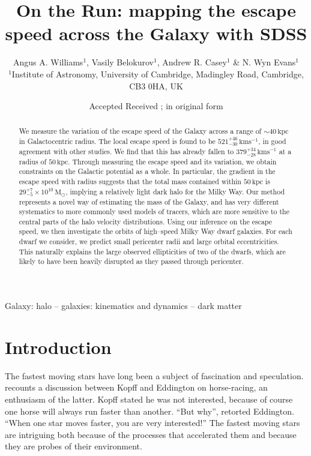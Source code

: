\documentclass[useAMS,twocolumn,usenatbib]{mn2e}
\title[Fast moving stars in SDSS] {On the Run: mapping the escape speed across the Galaxy with SDSS}
\author[Williams, Belokurov, Casey \& Evans]{Angus A. Williams$^1$,
  Vasily Belokurov$^1$, Andrew R. Casey$^1$ \& N. Wyn Evans$^1$
  \medskip
  \\$^1$Institute of Astronomy, University of Cambridge, Madingley Road, Cambridge, CB3 0HA, UK}
\def\kpc{{\,\mathrm{kpc}}}
\def\kms{{\,\mathrm{kms^{-1}}}}
\def\Msun{{\,\mathrm{M}_\odot}}
\begin{document}
\date{Accepted  Received ; in original form }

\pagerange{\pageref{firstpage}--\pageref{lastpage}} 

\maketitle

\label{firstpage}

\begin{abstract}
We measure the variation of the escape speed of the Galaxy across a range of $\sim 40\kpc$ in Galactocentric radius. 
The local escape speed is found to be $521^{+46}_{-30}\kms$, in good agreement with other studies. 
We find that this has already fallen to $379^{+34}_{-28}\kms$ at a radius of $50\kpc$. 
Through measuring the escape speed and its variation, we obtain constraints on the Galactic potential as a whole. 
In particular, the gradient in the escape speed with radius suggests that the total mass contained within $50\kpc$ is $29^{+7}_{-5}\times10^{10}\Msun$, implying a relatively light dark halo for the Milky Way. 
Our method represents a novel way of estimating the mass of the Galaxy, and has very different systematics to more commonly used models of tracers, which are more sensitive to the central parts of the halo velocity distributions. 
Using our inference on the escape speed, we then investigate the orbits of high--speed Milky Way dwarf galaxies. 
For each dwarf we consider, we predict small pericenter radii and large orbital eccentricities. 
This naturally explains the large observed ellipticities of two of the dwarfs, which are likely to have been heavily disrupted as they passed through pericenter.
\end{abstract}

\begin{keywords}
Galaxy: halo -- galaxies: kinematics and dynamics -- dark matter
\end{keywords}

\section{Introduction}

The fastest moving stars have long been a subject of fascination and speculation. 
\citet{Vi56} recounts a discussion between Kopff and Eddington on horse-racing, an enthusiasm of the latter. 
Kopff stated he was not interested, because of course one horse will always run faster than another.  
``But why'', retorted Eddington. ``When one star moves faster, you are very interested!'' 
The fastest moving stars are intriguing both because of the processes that accelerated them and because they are probes of their environment.
\end{document}
